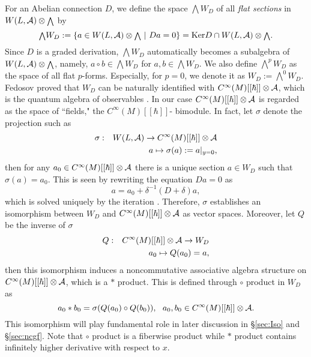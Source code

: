 \documentclass[10pt,a4paper]{article}
\def\h{\hbar}
\begin{document}
For an Abelian connection $D$, we define the space ${\scriptstyle \bigwedge} W_D$ of all {\it flat sections} in $W(L,{\cal A})\otimes{\scriptstyle \bigwedge}$ by
\begin{equation}
{{\scriptstyle \bigwedge}}W_D:=\{a\in W(L,{\cal A})\otimes {\scriptstyle \bigwedge}\  |\  Da=0\}={\rm Ker}D\cap W(L,{\cal A})\otimes{\scriptstyle \bigwedge}.
\end{equation}
Since $D$ is a graded derivation, ${\scriptstyle \bigwedge} W_D$ automatically becomes a subalgebra of $W(L,{\cal A})\otimes{\scriptstyle \bigwedge}$, namely, $a\circ b\in{\scriptstyle \bigwedge} W_D$ for $a,b\in{\scriptstyle \bigwedge} W_D$. We also define ${{\scriptstyle \bigwedge}}^pW_D$ as the space of all flat $p$-forms. Especially, for $p=0$, we denote it as $W_D:={\scriptstyle \bigwedge}^0 W_D$. Fedosov proved that $W_D$ can be naturally identified with $C^\infty(M)[[\h]]\otimes {\cal A}$, which is the quantum algebra of observables \cite{Fed}\cite{Fedbk}. In our case $C^\infty(M)[[\h]]\otimes {\cal A}$ is regarded as the space of ``fields,"  the $C^\infty(M)[[\h]]$- bimodule. In fact, let $\sigma$ denote the projection such as
\begin{eqnarray} 
 \sigma &:& W(L,{\cal A})  \rightarrow  C^\infty(M)[[\h]]\otimes {\cal A}\nonumber\\
 &   & a  \mapsto  \sigma(a):=a|_{y=0},
\end{eqnarray}
then for any $a_0\in C^\infty(M)[[\h]]\otimes {\cal A}$ there is a unique section $a\in W_D$ such that $\sigma(a)=a_0$. This is seen by rewriting the equation $Da=0$ as
\begin{equation}
\label{eqn:aita}
a=a_0+\delta^{-1}(D+\delta)a,
\end{equation}
which is solved uniquely by the iteration \cite{Fed}\cite{Fedbk}. Therefore, $\sigma$ establishes an isomorphism between $W_D$ and $C^\infty(M)[[\h]]\otimes {\cal A}$ as vector spaces. Moreover, let $Q$ be the inverse of $\sigma$  
\begin{eqnarray}
 Q &:& C^\infty(M)[[\h]]\otimes {\cal A}\rightarrow W_D\nonumber\\
 &   & a_0 \mapsto  Q(a_0)=a ,
\end{eqnarray}
then this isomorphism induces a noncommutative associative algebra structure on $C^\infty(M)[[\h]]\otimes {\cal A}$, which is a $*$ product. This is defined through $\circ$ product in $W_D$ as
\begin{equation}
\label{eqn:strdfn}
a_0*b_0=\sigma(Q(a_0)\circ Q(b_0)),\ \ a_0,b_0\in C^\infty(M)[[\h]]\otimes {\cal A}.
\end{equation}
This isomorphism will play fundamental role in later discussion in \S\ref{sec:Iso} and \S\ref{sec:ncgf}.
Note that $\circ$ product is a fiberwise product while $*$ product contains infinitely higher derivative with respect to $x$.
\\
\end{document}
